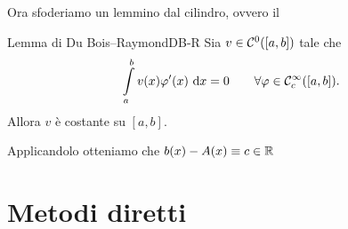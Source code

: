 \documentclass[openany]{book}
\begin{document}
Ora sfoderiamo un lemmino dal cilindro, ovvero il 

\begin{lemma}{Lemma di Du Bois--Raymond}{DB-R}
    Sia $v \in \mathcal{C}^0([a,b])$ tale che 
    \[ \intop_a^b v(x) \varphi'(x) \de x = 0 \qquad \forall \varphi \in \mc{C}_c^\infty([a,b]).\]
    Allora $v$ è costante su $[a,b]$.
    \proof 
    
\end{lemma}

Applicandolo otteniamo che $b(x)-A(x) \equiv c \in \mathbb{R}$

\chapter{Metodi diretti}

\printbibliography[heading=bibintoc]
\end{document}
